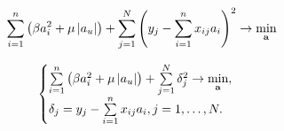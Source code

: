 
\begin{equation}
	\label{basicEN}
	\sum_{i=1}^n\left(\beta a_i^2 + \mu \left|a_u\right|\right) 
	+ \sum_{j=1}^N\left(y_j - \sum_{i=1}^nx_{ij}a_i\right)^2 
	\to \mathop{\mbox{min}}\limits_{\boldsymbol{\mathbf{a}}}
\end{equation}

\begin{equation}
	\label{basicENdelta}
	\begin{cases}
		\sum\limits_{i=1}^n\left(\beta a_i^2 + \mu \left|a_u\right|\right) 
	+ \sum\limits_{j=1}^N \delta_j^2 \to \mathop{\mbox{min}}\limits_{\boldsymbol{\mathbf{a}}}, \\
	\delta_j = y_j - \sum\limits_{i=1}^nx_{ij}a_i, j=1,\ldots,N. 
	\end{cases}
\end{equation}